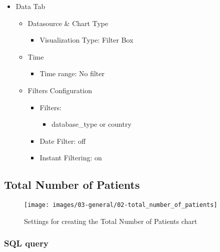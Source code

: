 \documentclass[
]{book}
\providecommand{\tightlist}{%
  \setlength{\itemsep}{0pt}\setlength{\parskip}{0pt}}
\begin{document}
\begin{itemize}
\tightlist
\item
  Data Tab

  \begin{itemize}
  \tightlist
  \item
    Datasource \& Chart Type

    \begin{itemize}
    \tightlist
    \item
      Visualization Type: Filter Box
    \end{itemize}
  \item
    Time

    \begin{itemize}
    \tightlist
    \item
      Time range: No filter
    \end{itemize}
  \item
    Filters Configuration

    \begin{itemize}
    \tightlist
    \item
      Filters:

      \begin{itemize}
      \tightlist
      \item
        database\_type or country
      \end{itemize}
    \item
      Date Filter: off
    \item
      Instant Filtering: on
    \end{itemize}
  \end{itemize}
\end{itemize}

\hypertarget{total-number-of-patients}{%
\subsection*{Total Number of Patients}\label{total-number-of-patients}}

\begin{figure}
\texttt{[image: images/03-general/02-total\_number\_of\_patients]} \caption{Settings for creating the Total Number of Patients chart}\label{fig:totalNumberOfPatients}
\end{figure}

\hypertarget{sql-query-1}{%
\subsubsection*{SQL query}\label{sql-query-1}}
\end{document}
